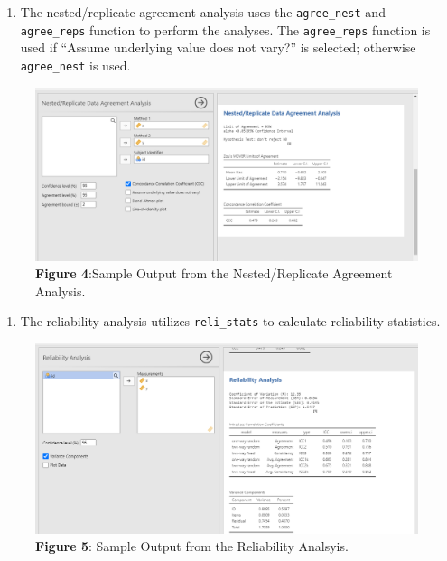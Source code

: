 \documentclass[
]{article}
\providecommand{\tightlist}{%
  \setlength{\itemsep}{0pt}\setlength{\parskip}{0pt}}
\begin{document}
\begin{enumerate}
\def\labelenumi{\arabic{enumi}.}
\setcounter{enumi}{1}
\tightlist
\item
  The nested/replicate agreement analysis uses the \texttt{agree\_nest}
  and \texttt{agree\_reps} function to perform the analyses. The
  \texttt{agree\_reps} function is used if ``Assume underlying value
  does not vary?'' is selected; otherwise \texttt{agree\_nest} is used.
\end{enumerate}

\begin{figure}
\centering
\includegraphics{nested_agreement.PNG}
\caption{\textbf{Figure 4}:Sample Output from the Nested/Replicate
Agreement Analysis.}
\end{figure}

\begin{enumerate}
\def\labelenumi{\arabic{enumi}.}
\setcounter{enumi}{2}
\tightlist
\item
  The reliability analysis utilizes \texttt{reli\_stats} to calculate
  reliability statistics.
\end{enumerate}

\begin{figure}
\centering
\includegraphics{reliability.PNG}
\caption{\textbf{Figure 5}: Sample Output from the Reliability
Analsyis.}
\end{figure}
\end{document}
